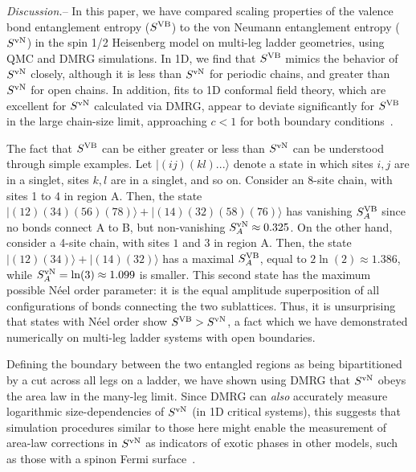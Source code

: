 \documentclass[prl,aps,twocolumn,floatfix,amsmath,amssymb,superscriptaddress,tightenlines]{revtex4}
\begin{document}
{\it Discussion.}-- In this paper, we have compared scaling properties of
the valence bond entanglement entropy ($S^{\rm VB}$) \cite{Alet,Chh} to the von Neumann entanglement entropy ($S^{ \rm vN}$) in the
spin 1/2 Heisenberg model on multi-leg ladder geometries, using QMC and DMRG simulations.
In 1D, we find
that $S^{\rm VB}$ mimics the behavior of $S^{ \rm vN}$ closely, although 
it is less than $S^{ \rm vN}$ for periodic
chains, and greater than $S^{ \rm vN}$ for open chains. In addition, fits to
1D conformal field theory, which are excellent for $S^{ \rm vN}$ calculated
via DMRG, appear to deviate significantly for $S^{\rm VB}$ in the large
chain-size limit, approaching $c<1$ for both boundary conditions~\cite{XXX}.

The fact  that $S^{\rm VB}$ can be either greater or less than $S^{ \rm
vN}$ can be understood through simple examples. Let $|(ij)(kl)...\rangle$
denote a state in which sites $i,j$ are in a singlet, sites $k,l$ are in a
singlet, and so on.  Consider an 8-site chain, with sites 1 to 4 in region
A. Then, the state $|(12)(34)(56)(78)\rangle+|(14)(32)(58)(76)\rangle$ has
vanishing $S^{\rm VB}_A$ since no bonds connect A to B, but
non-vanishing $S^{ \rm vN}_A \approx 0.325$.  On the other hand, consider a 4-site chain,
with sites $1$ and $3$ in region A. Then, the state
$|(12)(34)\rangle+|(14)(32)\rangle$ has a maximal $S^{\rm VB}_A$, equal to
$2\ln(2) \approx 1.386$, while $S^{ \rm vN}_A = \ln(3) \approx 1.099$ is smaller.  This second state
has the maximum possible N\'eel order parameter: it is the
equal amplitude superposition of all configurations of bonds connecting the
two sublattices.
Thus, it is unsurprising that states with N\'eel order show $S^{\rm VB} > S^{ \rm vN}$,
a fact which we have demonstrated numerically on multi-leg ladder systems with open boundaries.


Defining the boundary between the two entangled regions as being bipartitioned by a cut across all legs
on a ladder, we have shown using DMRG that $S^{ \rm vN}$ obeys the area law in the many-leg limit.   
Since DMRG can {\it also} accurately measure logarithmic size-dependencies of $S^{\rm vN}$ (in 1D critical systems), this suggests that simulation procedures similar to those here might enable the measurement of area-law corrections in $S^{\rm vN}$ as indicators of exotic phases in other models, such as those with
a spinon Fermi surface~\cite{BoseMetal}.
\end{document}
